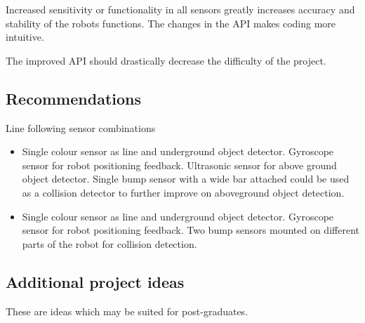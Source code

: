 \documentclass[11pt, a4paper, oneside]{article}
\begin{document}
   		Increased sensitivity or functionality in all sensors greatly increases accuracy and stability of the robots functions. The changes in the API makes coding more intuitive. 
   		
   		The improved API should drastically decrease the difficulty of the project. 
   		
   		
   		\subsection{Recommendations}
			Line following sensor combinations
			
			\begin{itemize}
			\item Single colour sensor as line and underground object detector. Gyroscope sensor for robot positioning feedback. Ultrasonic sensor for above ground object detector. Single bump sensor with a wide bar attached could be used as a collision detector to further improve on aboveground object detection.
			\item Single colour sensor as line and underground object detector. Gyroscope sensor for robot positioning feedback. Two bump sensors mounted on different parts of the robot for collision detection.
			\end{itemize}
			
			
   		\subsection{Additional project ideas}
   		These are ideas which may be suited for post-graduates. 
   		
\end{document}
